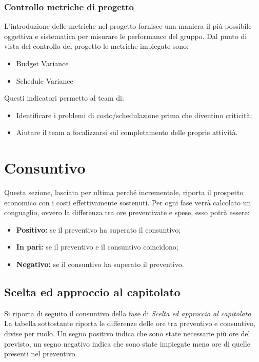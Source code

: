 \documentclass[a4paper]{article}
\begin{document}
			\subsubsection{Controllo metriche di progetto}
				L'introduzione delle metriche nel progetto fornisce una maniera il più possibile oggettiva e sistematica per
				misurare le performance del gruppo. Dal punto di vista del controllo del progetto le metriche impiegate sono:
				\begin{itemize}
					\item Budget Variance
					\item Schedule Variance
				\end{itemize}
				Questi indicatori permetto al team di:
				\begin{itemize}
					\item Identificare i problemi di costo/schedulazione prima che diventino criticità;
					\item Aiutare il team a focalizzarsi sul completamento delle proprie attività.
				\end{itemize}


	\newpage 
	\section{Consuntivo}
	
		Questa sezione, lasciata per ultima perché incrementale, riporta il prospetto economico con i 
		costi effettivamente sostenuti. Per ogni fase verrà calcolato un conguaglio, ovvero la differenza
		tra ore preventivate e spese, esso potrà essere:
		\begin{itemize}
			\item \textbf{Positivo:} se il preventivo ha superato il consuntivo;
			\item \textbf{In pari:} se il preventivo e il consuntivo coincidono;
			\item \textbf{Negativo:} se il consuntivo ha superato il preventivo.
		\end{itemize}
		
		\subsection{Scelta ed approccio al capitolato}
			Si riporta di seguito il consuntivo della fase di \emph{Scelta ed approccio al capitolato}. \\
			La tabella sottostante riporta le differenze delle ore tra preventivo e consuntivo, divise per ruolo. 
			Un segno positivo indica che sono state necessarie più ore del previsto, un segno negativo indica che sono 
			state impiegate meno ore di quelle presenti nel preventivo.
						
\end{document}
